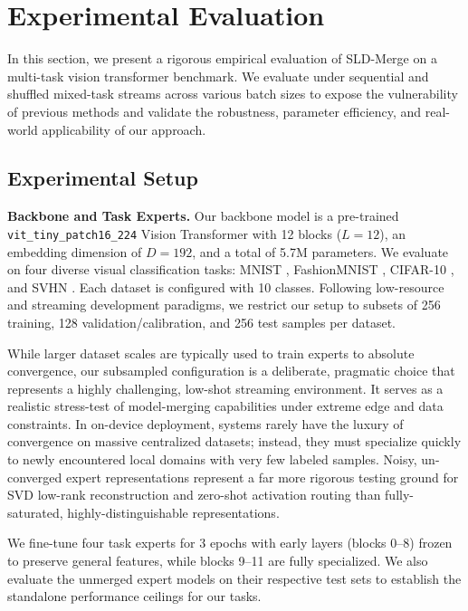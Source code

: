 \section{Experimental Evaluation}
\label{sec:experiments}

In this section, we present a rigorous empirical evaluation of SLD-Merge on a multi-task vision transformer benchmark. We evaluate under sequential and shuffled mixed-task streams across various batch sizes to expose the vulnerability of previous methods and validate the robustness, parameter efficiency, and real-world applicability of our approach.

\subsection{Experimental Setup}
\textbf{Backbone and Task Experts.} 
Our backbone model is a pre-trained \texttt{vit\_tiny\_patch16\_224} Vision Transformer \cite{dosovitskiy2020vit} with 12 blocks ($L=12$), an embedding dimension of $D=192$, and a total of 5.7M parameters. We evaluate on four diverse visual classification tasks: MNIST \cite{lecun1998mnist}, FashionMNIST \cite{xiao2017fashion}, CIFAR-10 \cite{krizhevsky2009cifar}, and SVHN \cite{netzer2011svhn}. Each dataset is configured with 10 classes. Following low-resource and streaming development paradigms, we restrict our setup to subsets of 256 training, 128 validation/calibration, and 256 test samples per dataset. 

While larger dataset scales are typically used to train experts to absolute convergence, our subsampled configuration is a deliberate, pragmatic choice that represents a highly challenging, low-shot streaming environment. It serves as a realistic stress-test of model-merging capabilities under extreme edge and data constraints. In on-device deployment, systems rarely have the luxury of convergence on massive centralized datasets; instead, they must specialize quickly to newly encountered local domains with very few labeled samples. Noisy, un-converged expert representations represent a far more rigorous testing ground for SVD low-rank reconstruction and zero-shot activation routing than fully-saturated, highly-distinguishable representations.

We fine-tune four task experts for 3 epochs with early layers (blocks 0--8) frozen to preserve general features, while blocks 9--11 are fully specialized. We also evaluate the unmerged expert models on their respective test sets to establish the standalone performance ceilings for our tasks.

